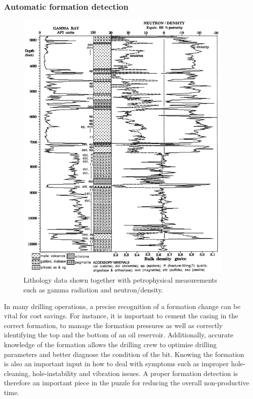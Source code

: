 \subsubsection{Automatic formation detection}\label{SubSection:DetectionFormation}

\begin{figure}
\begin{center}
\includegraphics [keepaspectratio,width = 10.7cm] {figures/lithologyGamma.png}
\caption{Lithology data shown together with petrophysical measurements such as gamma radiation and neutron/density.}
\label{lithology}
\end{center}
\end{figure}

In many drilling operations, a precise recognition of a formation change can be vital for cost savings. 
For instance, it is important to cement the casing in the correct formation, to manage the formation pressures as well as correctly identifying the top and the bottom of an oil reservoir. 
Additionally, accurate knowledge of the formation allows the drilling crew to optimise drilling parameters and better diagnose the condition of the bit. 
Knowing the formation is also an important input in how to deal with symptoms such as improper hole-cleaning, hole-instability and vibration issues. 
A proper formation detection is therefore an important piece in the puzzle for reducing the overall non-productive time.

